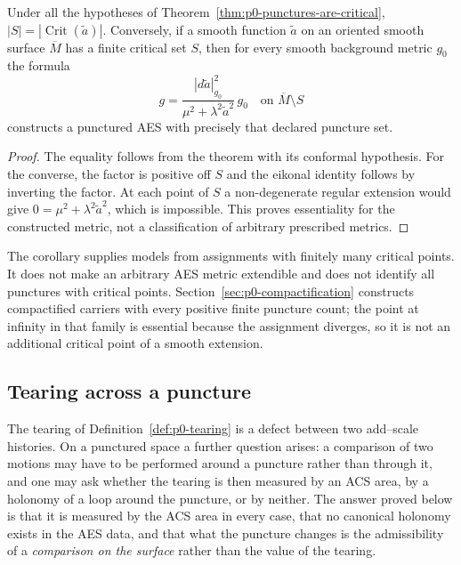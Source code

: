 \begin{corollary}
\label{cor:p0-puncture-count}
Under all the hypotheses of Theorem~\ref{thm:p0-punctures-are-critical},
$|S|=|\operatorname{Crit}(\widetilde a)|$.  Conversely, if a smooth function
$\widetilde a$ on an oriented smooth surface $\overline M$ has a finite critical
set $S$, then for every smooth background metric $g_0$ the formula
\[
 g=\frac{|d\widetilde a|_{g_0}^2}{\mu^2+\lambda^2\widetilde a^2}\,g_0
 \quad\text{on }\overline M\setminus S
\]
constructs a punctured AES with precisely that declared puncture set.
\end{corollary}

\begin{proof}
The equality follows from the theorem with its conformal hypothesis.  For the
converse, the factor is positive off $S$ and the eikonal identity follows by
inverting the factor.  At each point of $S$ a non-degenerate regular extension
would give $0=\mu^2+\lambda^2\widetilde a^2$, which is impossible.  This proves
essentiality for the constructed metric, not a classification of arbitrary
prescribed metrics.
\end{proof}

\begin{remark}
\label{rem:p0-multi-puncture}
The corollary supplies models from assignments with finitely many critical
points.  It does not make an arbitrary AES metric extendible and does not
identify all punctures with critical points.  Section~\ref{sec:p0-compactification}
constructs compactified carriers with every positive finite puncture count;
the point at infinity in that family is essential because the assignment
diverges, so it is not an additional critical point of a smooth extension.
\end{remark}

\subsection{Tearing across a puncture}
\label{subsec:p0-tearing-at-puncture}

The tearing of Definition~\ref{def:p0-tearing} is a defect between two
add--scale histories.  On a punctured space a further question arises: a
comparison of two motions may have to be performed around a puncture rather than
through it, and one may ask whether the tearing is then measured by an ACS area,
by a holonomy of a loop around the puncture, or by neither.  The answer proved
below is that it is measured by the ACS area in every case, that no canonical
holonomy exists in the AES data, and that what the puncture changes is the
admissibility of a \emph{comparison on the surface} rather than the value of the
tearing.

